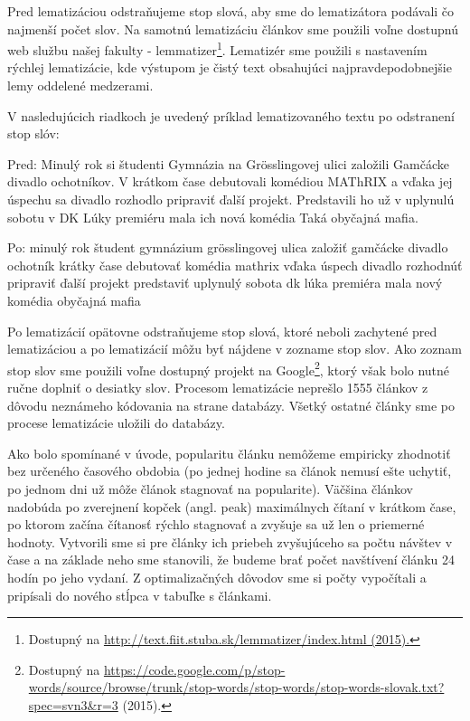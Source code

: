 \documentclass[runningheads,a4paper]{llncs}
\begin{document}
Pred lematizáciou odstraňujeme stop slová, aby sme do lematizátora podávali čo najmenší počet slov.
Na samotnú lematizáciu článkov sme použili voľne dostupnú web službu našej fakulty - lemmatizer\footnote{Dostupný na \url{http://text.fiit.stuba.sk/lemmatizer/index.html (2015).}}.
Lematizér sme použili s nastavením rýchlej lematizácie, kde výstupom je čistý text obsahujúci najpravdepodobnejšie lemy oddelené medzerami.

V nasledujúcich riadkoch je uvedený príklad lematizovaného textu po odstranení stop slóv:

\begin{multicols}{2}
Pred: Minulý rok si študenti Gymnázia na Grösslingovej ulici založili Gamčácke divadlo ochotníkov. V krátkom čase debutovali komédiou MAThRIX a vďaka jej úspechu sa divadlo rozhodlo pripraviť ďalší projekt. Predstavili ho už v uplynulú sobotu v DK Lúky premiéru mala ich nová komédia Taká obyčajná mafia.

Po: minulý rok študent gymnázium grösslingovej ulica založiť gamčácke divadlo ochotník krátky čase debutovať komédia mathrix vďaka úspech divadlo rozhodnúť pripraviť ďalší projekt predstaviť uplynulý sobota dk lúka premiéra mala nový komédia obyčajná mafia
\end{multicols}

Po lematizácií opätovne odstraňujeme stop slová, ktoré neboli zachytené pred lematizáciou a po lematizácií môžu byť nájdene v zozname stop slov.
Ako zoznam stop slov sme použili voľne dostupný projekt na Google\footnote{Dostupný na \url{https://code.google.com/p/stop-words/source/browse/trunk/stop-words/stop-words/stop-words-slovak.txt?spec=svn3&r=3} (2015).}, ktorý však bolo nutné ručne doplniť o desiatky slov.
Procesom lematizácie neprešlo 1555 článkov z dôvodu neznámeho kódovania na strane databázy. Všetký ostatné články sme po procese lematizácie uložili do databázy.  

Ako bolo spomínané v úvode, popularitu článku nemôžeme empiricky zhodnotiť bez určeného časového obdobia (po jednej hodine sa článok nemusí ešte uchytiť, po jednom dni už môže článok stagnovať na popularite).
Väčšina článkov nadobúda po zverejnení kopček (angl. peak) maximálnych čítaní v krátkom čase, po ktorom začína čítanosť rýchlo stagnovať a zvyšuje sa už len o priemerné hodnoty.
Vytvorili sme si pre články ich priebeh zvyšujúceho sa počtu návštev v čase a na základe neho sme stanovili, že budeme brať počet navštívení článku 24 hodín po jeho vydaní.
Z optimalizačných dôvodov sme si počty vypočítali a pripísali do nového stĺpca v tabuľke s článkami.
\end{document}
